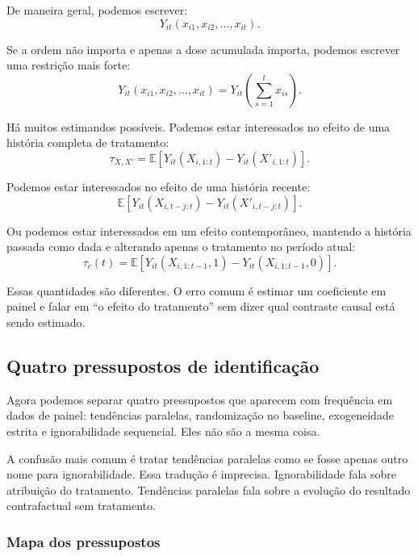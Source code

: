 \documentclass[
]{article}
\begin{document}
De maneira geral, podemos escrever:
\[
Y_{it}(x_{i1}, x_{i2}, \ldots, x_{it}).
\]

Se a ordem não importa e apenas a dose acumulada importa, podemos escrever uma restrição mais forte:
\[
Y_{it}(x_{i1}, x_{i2}, \ldots, x_{it}) =
Y_{it}\left(\sum_{s=1}^t x_{is}\right).
\]

Há muitos estimandos possíveis. Podemos estar interessados no efeito de uma história completa de tratamento:
\[
\tau_{X,X'} =
\mathbb{E}[Y_{it}(X_{i,1:t}) - Y_{it}(X'_{i,1:t})].
\]

Podemos estar interessados no efeito de uma história recente:
\[
\mathbb{E}[Y_{it}(X_{i,t-j:t}) - Y_{it}(X'_{i,t-j:t})].
\]

Ou podemos estar interessados em um efeito contemporâneo, mantendo a história passada como dada e alterando apenas o tratamento no período atual:
\[
\tau_c(t) =
\mathbb{E}[Y_{it}(X_{i,1:t-1}, 1) - Y_{it}(X_{i,1:t-1}, 0)].
\]

Essas quantidades são diferentes. O erro comum é estimar um coeficiente em painel e falar em ``o efeito do tratamento'' sem dizer qual contraste causal está sendo estimado.

\subsection{Quatro pressupostos de identificação}\label{quatro-pressupostos-de-identificauxe7uxe3o}

Agora podemos separar quatro pressupostos que aparecem com frequência em dados de painel: tendências paralelas, randomização no baseline, exogeneidade estrita e ignorabilidade sequencial. Eles não são a mesma coisa.

A confusão mais comum é tratar tendências paralelas como se fosse apenas outro nome para ignorabilidade. Essa tradução é imprecisa. Ignorabilidade fala sobre atribuição do tratamento. Tendências paralelas fala sobre a evolução do resultado contrafactual sem tratamento.

\subsubsection{Mapa dos pressupostos}\label{mapa-dos-pressupostos}
\end{document}
